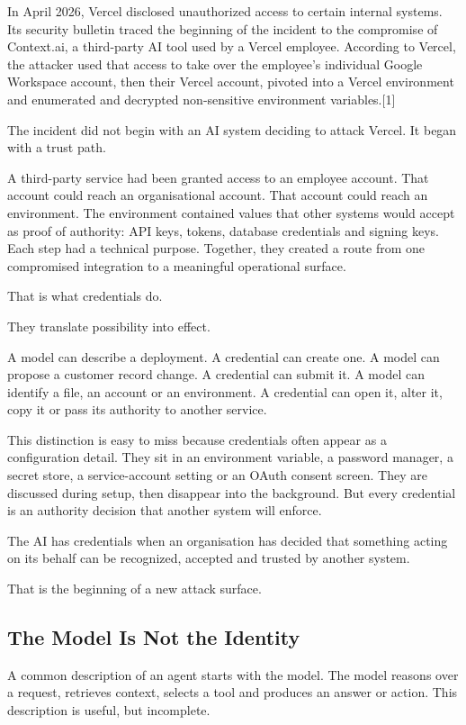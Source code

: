 In April 2026, Vercel disclosed unauthorized access to certain internal
systems. Its security bulletin traced the beginning of the incident to
the compromise of Context.ai, a third-party AI tool used by a Vercel
employee. According to Vercel, the attacker used that access to take
over the employee's individual Google Workspace account, then their
Vercel account, pivoted into a Vercel environment and enumerated and
decrypted non-sensitive environment variables.{[}1{]}

The incident did not begin with an AI system deciding to attack Vercel.
It began with a trust path.

A third-party service had been granted access to an employee account.
That account could reach an organisational account. That account could
reach an environment. The environment contained values that other
systems would accept as proof of authority: API keys, tokens, database
credentials and signing keys. Each step had a technical purpose.
Together, they created a route from one compromised integration to a
meaningful operational surface.

That is what credentials do.

They translate possibility into effect.

A model can describe a deployment. A credential can create one. A model
can propose a customer record change. A credential can submit it. A
model can identify a file, an account or an environment. A credential
can open it, alter it, copy it or pass its authority to another service.

This distinction is easy to miss because credentials often appear as a
configuration detail. They sit in an environment variable, a password
manager, a secret store, a service-account setting or an OAuth consent
screen. They are discussed during setup, then disappear into the
background. But every credential is an authority decision that another
system will enforce.

The AI has credentials when an organisation has decided that something
acting on its behalf can be recognized, accepted and trusted by another
system.

That is the beginning of a new attack surface.

\subsection{The Model Is Not the
Identity}\label{the-model-is-not-the-identity}

A common description of an agent starts with the model. The model
reasons over a request, retrieves context, selects a tool and produces
an answer or action. This description is useful, but incomplete.

